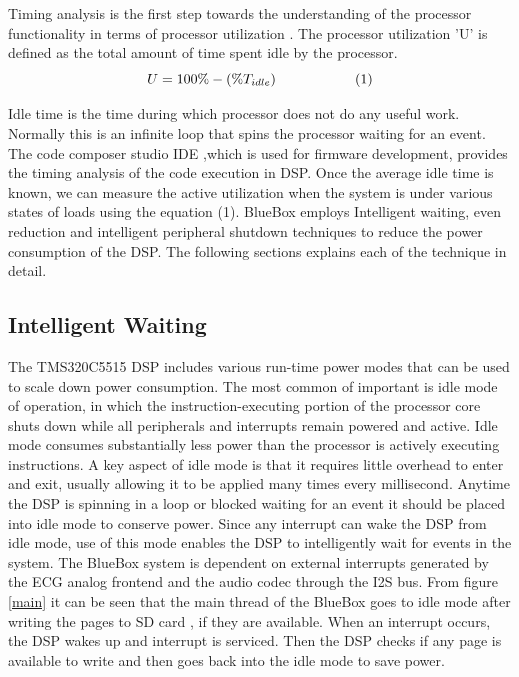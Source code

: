 Timing analysis is the first step towards the understanding of the processor functionality in terms of processor utilization \cite{sastra}. The processor utilization 'U' is defined as the total amount of time spent idle by the processor. 
\[ U = 100\% - (\% T_{idle}) \hspace{20mm} (1)\]

Idle time is the time during which processor does not do any useful work. Normally this is an infinite loop that spins the processor waiting for an event. The code composer studio IDE ,which is used for firmware development,  provides the timing analysis of the code execution in DSP. Once the average idle time is known, we can measure the active utilization when the system is under various states of loads using the equation (1). BlueBox employs Intelligent waiting, even reduction and intelligent peripheral shutdown techniques to reduce the power consumption of the DSP. The following sections explains each of the technique in detail. 

\subsection{Intelligent Waiting}
The TMS320C5515 DSP includes various run-time power modes that can be used to scale down power consumption. The most common of important is idle mode of operation, in which the instruction-executing portion of the processor core shuts down while all peripherals and interrupts remain powered and active. Idle mode consumes substantially less power than the 
processor is actively executing instructions. A key aspect of idle mode is that it requires little overhead to enter and exit, usually allowing it to be applied many times every millisecond. Anytime the DSP is spinning in a loop or blocked waiting for an event it should be placed into idle mode to conserve power. Since any interrupt can wake the DSP from idle mode, use of this mode enables the DSP to intelligently wait for events in the system.  
The BlueBox system is dependent on external interrupts generated by the ECG analog frontend and the audio codec through the I2S bus. From figure \ref{main} it can be seen that the main thread of the BlueBox goes to idle mode after writing the pages to SD card , if they are available. When an interrupt occurs, the DSP wakes up and interrupt is serviced. Then the DSP checks if any page is available to write and then goes back into the idle mode to save power. 


